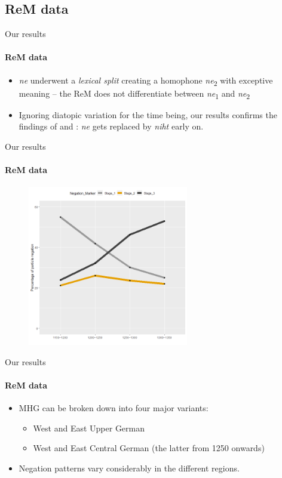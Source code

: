 \documentclass[xcolor=table, compress, %
handout
]{beamer}
\begin{document}
\subsection{ReM data}


\begin{frame}{Our results}
\framesubtitle{ReM data}
    
    \begin{itemize}
        \item \textit{ne} underwent a \textit{lexical split} creating a homophone \textit{ne}\textsubscript{2} with exceptive meaning – the ReM does not differentiate between \textit{ne}\textsubscript{1} and \textit{ne}\textsubscript{2}
        \item Ignoring diatopic variation for the time being, our results confirms the findings of \citet{jaeger08} and \citet{Pickl2017}: \textit{ne} gets replaced by \textit{niht} early on.
    \end{itemize}
    
\end{frame}


\begin{frame}{Our results}
\framesubtitle{ReM data}
    
    \begin{figure}[h]
\centering
\includegraphics[width=7cm]{Diachron.png}
\end{figure}
    
\end{frame}


\begin{frame}{Our results}
\framesubtitle{ReM data}

\begin{itemize}
\item MHG can be broken down into four major variants: 
\begin{itemize}
\item West and East Upper German
\item West and East Central German (the latter from 1250 onwards)
\end{itemize}
\item Negation patterns vary considerably in the different regions.
\end{itemize}

\end{frame}
\end{document}
